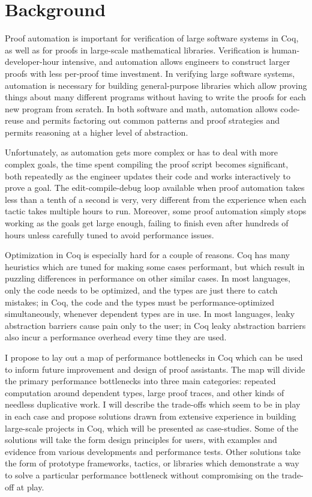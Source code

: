 \documentclass[twoside]{article}
\begin{document}
\section{Background}

Proof automation is important for verification of large software systems in Coq, as well as for proofs in large-scale mathematical libraries.
Verification is human-developer-hour intensive, and automation allows engineers to construct larger proofs with less per-proof time investment.
In verifying large software systems, automation is necessary for building general-purpose libraries which allow proving things about many different programs without having to write the proofs for each new program from scratch.
In both software and math, automation allows code-reuse and permits factoring out common patterns and proof strategies and permits reasoning at a higher level of abstraction.

Unfortunately, as automation gets more complex or has to deal with more complex goals, the time spent compiling the proof script becomes significant, both repeatedly as the engineer updates their code and works interactively to prove a goal.
The edit-compile-debug loop available when proof automation takes less than a tenth of a second is very, very different from the experience when each tactic takes multiple hours to run.
Moreover, some proof automation simply stops working as the goals get large enough, failing to finish even after hundreds of hours unless carefully tuned to avoid performance issues.

Optimization in Coq is especially hard for a couple of reasons.
Coq has many heuristics which are tuned for making some cases performant, but which result in puzzling differences in performance on other similar cases.
In most languages, only the code needs to be optimized, and the types are just there to catch mistakes;
in Coq, the code and the types must be performance-optimized simultaneously, whenever dependent types are in use.
In most languages, leaky abstraction barriers cause pain only to the user;
in Coq leaky abstraction barriers also incur a performance overhead every time they are used.

I propose to lay out a map of performance bottlenecks in Coq which can be used to inform future improvement and design of proof assistants.
The map will divide the primary performance bottlenecks into three main categories: repeated computation around dependent types, large proof traces, and other kinds of needless duplicative work.
I will describe the trade-offs which seem to be in play in each case and propose solutions drawn from extensive experience in building large-scale projects in Coq, which will be presented as case-studies.
Some of the solutions will take the form design principles for users, with examples and evidence from various developments and performance tests.
Other solutions take the form of prototype frameworks, tactics, or libraries which demonstrate a way to solve a particular performance bottleneck without compromising on the trade-off at play.
\end{document}
